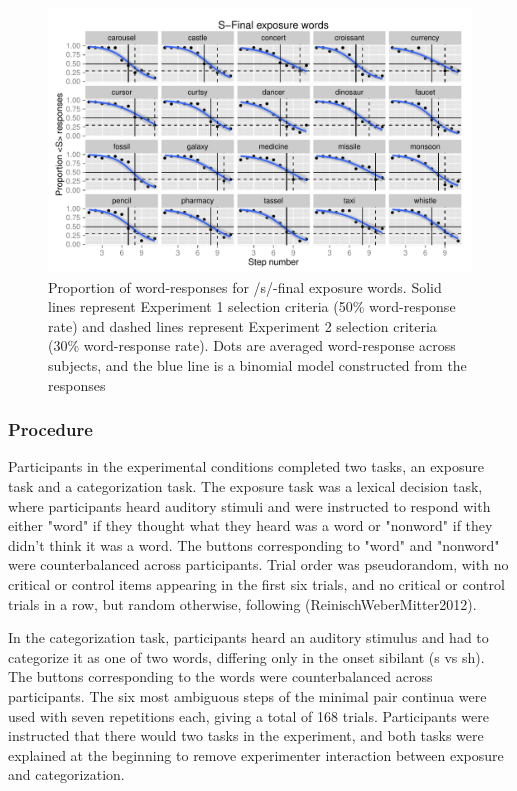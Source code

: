 \begin{figure}
\includegraphics[width=\textwidth]{sfinalpretest.pdf}
\caption{Proportion of word-responses for /s/-final exposure words. Solid lines represent Experiment 1 selection criteria (50\% word-response rate) and dashed lines represent Experiment 2 selection criteria (30\% word-response rate).  Dots are averaged word-response across subjects, and the blue line is a binomial model constructed from the responses}
\end{figure}

\subsubsection{Procedure}

Participants in the experimental conditions completed two tasks, an exposure task and a categorization task.  The exposure task was a lexical decision task, where participants heard auditory stimuli and were instructed to respond with either "word" if they thought what they heard was a word or "nonword" if they didn't think it was a word.  The buttons corresponding to "word" and "nonword" were counterbalanced across participants. Trial order was pseudorandom, with no critical or control items appearing in the first six trials, and no critical or control trials in a row, but random otherwise, following (ReinischWeberMitter2012).

In the categorization task, participants heard an auditory stimulus and had to categorize it as one of two words, differing only in the onset sibilant (s vs sh).  The buttons corresponding to the words were counterbalanced across participants.  The six most ambiguous steps of the minimal pair continua were used with seven repetitions each, giving a total of 168 trials. Participants were instructed that there would two tasks in the experiment, and both tasks were explained at the beginning to remove experimenter interaction between exposure and categorization.  

